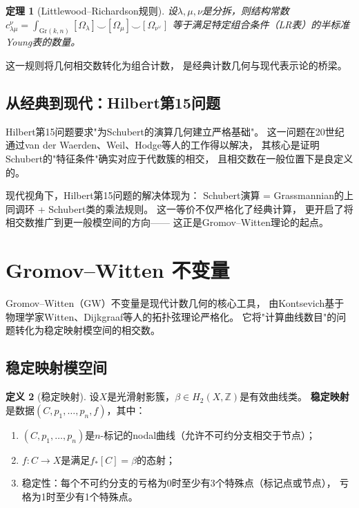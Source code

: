 \documentclass[11pt,a4paper]{article}
\theoremstyle{plain}
\newtheorem{theorem}{定理}[section]
\theoremstyle{definition}
\newtheorem{definition}[theorem]{定义}
\newcommand{\Z}{\mathbb{Z}}
\begin{document}
\begin{theorem}[Littlewood--Richardson规则]\label{thm:LR}
设$\lambda, \mu, \nu$是分拆，则结构常数
$c_{\lambda\mu}^{\nu} = \int_{\mathrm{Gr}(k,n)} [\Omega_\lambda] \smile [\Omega_\mu] \smile [\Omega_{\nu^\vee}]$
等于满足特定组合条件（LR表）的半标准Young表的数量。
\end{theorem}

这一规则将几何相交数转化为组合计数，
是经典计数几何与现代表示论的桥梁。

\subsection{从经典到现代：Hilbert第15问题}

Hilbert第15问题要求"为Schubert的演算几何建立严格基础"。
这一问题在20世纪通过van der Waerden、Weil、Hodge等人的工作得以解决，
其核心是证明Schubert的"特征条件"确实对应于代数簇的相交，
且相交数在一般位置下是良定义的。

现代视角下，Hilbert第15问题的解决体现为：
Schubert演算 = Grassmannian的上同调环 + Schubert类的乘法规则。
这一等价不仅严格化了经典计算，
更开启了将相交数推广到更一般模空间的方向——
这正是Gromov--Witten理论的起点。




\section{Gromov--Witten 不变量}\label{sec:gw}

Gromov--Witten（GW）不变量是现代计数几何的核心工具，
由Kontsevich基于物理学家Witten、Dijkgraaf等人的拓扑弦理论严格化。
它将"计算曲线数目"的问题转化为稳定映射模空间的相交数。

\subsection{稳定映射模空间}

\begin{definition}[稳定映射]\label{def:stablemap}
设$X$是光滑射影簇，$\beta \in H_2(X, \Z)$是有效曲线类。
\textbf{稳定映射}是数据$(C, p_1, \ldots, p_n, f)$，其中：
\begin{enumerate}[label=(\arabic*)]
\item $(C, p_1, \ldots, p_n)$是$n$-标记的nodal曲线（允许不可约分支相交于节点）；
\item $f: C \to X$是满足$f_*[C] = \beta$的态射；
\item 稳定性：每个不可约分支的亏格为0时至少有3个特殊点（标记点或节点），
亏格为1时至少有1个特殊点。
\end{enumerate}
\end{definition}
\end{document}
